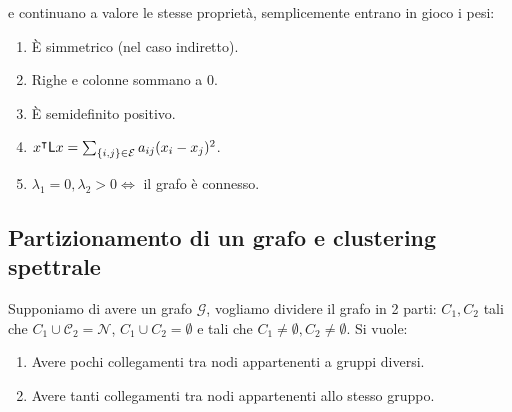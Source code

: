 e continuano a valore le stesse propriet\`a, semplicemente entrano in gioco i pesi:
\begin{enumerate}
\item \`E simmetrico (nel caso indiretto).
\item Righe e colonne sommano a 0.
\item \`E semidefinito positivo.
\item $x^\intercal \mathsf{L} x = \sum_{\{i,j\} \in \mathcal{E}} a_{ij} (x_i - x_j)^2$.
\item $\lambda_1 = 0, \lambda_2 > 0 \iff$ il grafo \`e connesso.
\end{enumerate}

\subsection{Partizionamento di un grafo e clustering spettrale}

Supponiamo di avere un grafo $\mathcal{G}$, vogliamo dividere il grafo in 2 parti: $C_1, C_2$ tali che $C_1 \cup \mathcal{C}_2 = \mathcal{N}$, $C_1 \cup C_2 = \emptyset$ e tali che $C_1 \neq \emptyset, C_2 \neq \emptyset$. Si vuole:
\begin{enumerate}
\item Avere pochi collegamenti tra nodi appartenenti a gruppi diversi.
\item Avere tanti collegamenti tra nodi appartenenti allo stesso gruppo.
\end{enumerate}

